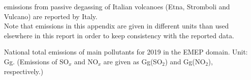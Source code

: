 \sox emissions from passive degassing of Italian volcanoes (Etna, Stromboli and Vulcano) are reported by Italy. \\

Note that emissions in this appendix are given in different units than used elsewhere in this report in order to keep consistency with the reported data.


\clearpage


\renewcommand\bibname{References}    


\clearpage
 
\begin{table}
\caption{National total emissions of main pollutants for 2019 in the EMEP
  domain. Unit: Gg. (Emissions of SO$_x$ and NO$_x$ are given as
  Gg(SO$_2$) and Gg(NO$_2$), respectively.)}
\label{tab:2019emisMAIN}

\vspace{15pt}


\end{table}
